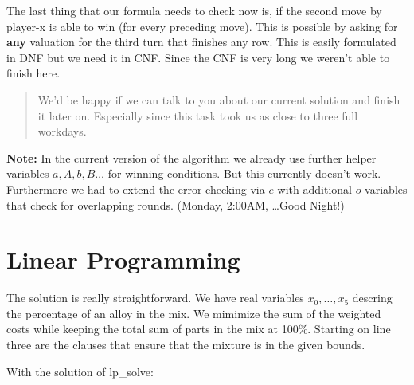 \documentclass{base}
\begin{document}
The last thing that our formula needs to check now is, if the second move by player-x is able to win (for every preceding move).
This is possible by asking for \textbf{any} valuation for the third turn that finishes any row.
This is easily formulated in DNF but we need it in CNF. Since the CNF is very long we weren't able to finish here.


\vspace*{2em} 
\begin{quote} 
\centering 
We'd be happy if we can talk to you about our current solution and finish it later on.
Especially since this task took us as close to three full workdays.
\end{quote}
\vspace*{2em}
\textbf{Note:} In the current version of the algorithm we already use further helper variables $a,A,b,B\dots$ for winning conditions. But this currently doesn't work.
Furthermore we had to extend the error checking via $e$ with additional $o$ variables that check for overlapping rounds. (Monday, 2:00AM, \dots Good Night!)



\clearpage
\section*{Linear Programming}

The solution is really straightforward.
We have real variables $x_0,\dots,x_5$ descring the percentage of an alloy in the mix.
We mimimize the sum of the weighted costs while keeping the total sum of parts in the mix at 100\%.
Starting on line three are the clauses that ensure that the mixture is in the given bounds.

With the solution of lp\_solve:

\end{document}
